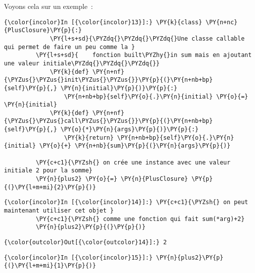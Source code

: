     Voyons cela sur un exemple~:

    \begin{Verbatim}[commandchars=\\\{\},frame=single,framerule=0.3mm,rulecolor=\color{cellframecolor}]
{\color{incolor}In [{\color{incolor}13}]:} \PY{k}{class} \PY{n+nc}{PlusClosure}\PY{p}{:}
             \PY{l+s+sd}{\PYZdq{}\PYZdq{}\PYZdq{}Une classe callable qui permet de faire un peu comme la }
         \PY{l+s+sd}{    fonction built\PYZhy{}in sum mais en ajoutant une valeur initiale\PYZdq{}\PYZdq{}\PYZdq{}}
             \PY{k}{def} \PY{n+nf}{\PYZus{}\PYZus{}init\PYZus{}\PYZus{}}\PY{p}{(}\PY{n+nb+bp}{self}\PY{p}{,} \PY{n}{initial}\PY{p}{)}\PY{p}{:}
                 \PY{n+nb+bp}{self}\PY{o}{.}\PY{n}{initial} \PY{o}{=} \PY{n}{initial}
             \PY{k}{def} \PY{n+nf}{\PYZus{}\PYZus{}call\PYZus{}\PYZus{}}\PY{p}{(}\PY{n+nb+bp}{self}\PY{p}{,} \PY{o}{*}\PY{n}{args}\PY{p}{)}\PY{p}{:}
                 \PY{k}{return} \PY{n+nb+bp}{self}\PY{o}{.}\PY{n}{initial} \PY{o}{+} \PY{n+nb}{sum}\PY{p}{(}\PY{n}{args}\PY{p}{)}
             
         \PY{c+c1}{\PYZsh{} on crée une instance avec une valeur initiale 2 pour la somme}
         \PY{n}{plus2} \PY{o}{=} \PY{n}{PlusClosure} \PY{p}{(}\PY{l+m+mi}{2}\PY{p}{)}
\end{Verbatim}


    \begin{Verbatim}[commandchars=\\\{\},frame=single,framerule=0.3mm,rulecolor=\color{cellframecolor}]
{\color{incolor}In [{\color{incolor}14}]:} \PY{c+c1}{\PYZsh{} on peut maintenant utiliser cet objet }
         \PY{c+c1}{\PYZsh{} comme une fonction qui fait sum(*arg)+2}
         \PY{n}{plus2}\PY{p}{(}\PY{p}{)}
\end{Verbatim}


\begin{Verbatim}[commandchars=\\\{\},frame=single,framerule=0.3mm,rulecolor=\color{cellframecolor}]
{\color{outcolor}Out[{\color{outcolor}14}]:} 2
\end{Verbatim}
            
    \begin{Verbatim}[commandchars=\\\{\},frame=single,framerule=0.3mm,rulecolor=\color{cellframecolor}]
{\color{incolor}In [{\color{incolor}15}]:} \PY{n}{plus2}\PY{p}{(}\PY{l+m+mi}{1}\PY{p}{)}
\end{Verbatim}


